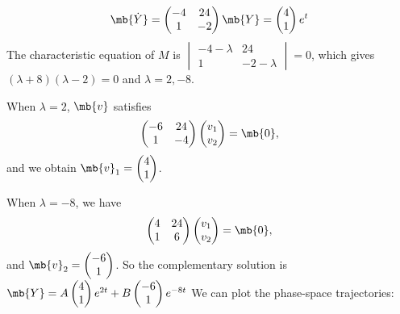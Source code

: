 \documentclass[a4paper]{article}
\begin{document}
\begin{eg}
  \[
  \mb{\dot{Y}} = 
  \begin{pmatrix}
    -4 & 24\\
    1 & -2
  \end{pmatrix}
  \mb{Y} = 
  \begin{pmatrix}
    4\\1
  \end{pmatrix}e^t
  \]
  The characteristic equation of $M$ is $
  \begin{vmatrix}
    -4 - \lambda & 24\\
    1 & -2 - \lambda
  \end{vmatrix} = 0$, which gives $(\lambda + 8)(\lambda - 2) = 0$ and $\lambda = 2, -8$.

  When $\lambda = 2$, $\mb{v}$ satisfies
  \[
  \begin{pmatrix}
    -6 & 24\\
    1 & -4
  \end{pmatrix}
  \begin{pmatrix}
    v_1\\v_2
  \end{pmatrix} = \mb{0},
  \]
  and we obtain $\mb{v}_1 = 
  \begin{pmatrix}
    4\\1
  \end{pmatrix}$.

  When $\lambda = -8$, we have
  \[
  \begin{pmatrix}
    4 & 24\\
    1 & 6
  \end{pmatrix}
  \begin{pmatrix}
    v_1\\v_2
  \end{pmatrix} = \mb{0},
  \]
  and $\mb{v}_2 = 
  \begin{pmatrix}
    -6 \\1
  \end{pmatrix}$. So the complementary solution is 
  $\mb{Y} = A
  \begin{pmatrix}
    4\\1
  \end{pmatrix}e^{2t} + B
  \begin{pmatrix}
    -6\\1
  \end{pmatrix}e^{-8t}$
We can plot the phase-space trajectories:



\end{eg}
\end{document}
